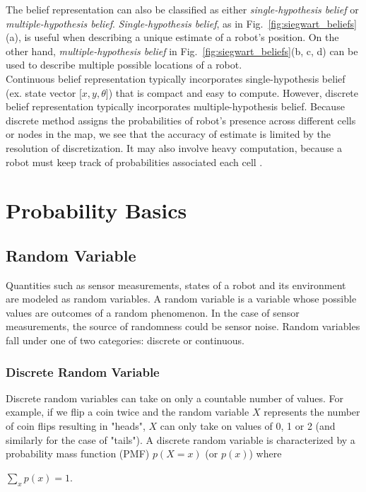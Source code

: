 \documentclass[twoside]{article}
\begin{document}
The belief representation can also be classified as either \emph{single-hypothesis belief} or \emph{multiple-hypothesis belief}. \emph{Single-hypothesis belief}, as in Fig.~\ref{fig:siegwart_beliefs}(a), is useful when describing a unique estimate of a robot's position. On the other hand, \emph{multiple-hypothesis belief} in Fig.~\ref{fig:siegwart_beliefs}(b, c, d) can be used to describe multiple possible locations of a robot. \\

Continuous belief representation typically incorporates single-hypothesis belief (ex. state vector [$x, y, \theta$]) that is compact and easy to compute. However, discrete belief representation typically incorporates multiple-hypothesis belief. Because discrete method assigns the probabilities of robot's presence across different cells or nodes in the map, we see that the accuracy of estimate is limited by the resolution of discretization. It may also involve heavy computation, because a robot must keep track of probabilities associated each cell \cite{Clark}.

\section{Probability Basics}

\subsection{Random Variable}

Quantities such as sensor measurements, states of a robot and its environment are modeled as random variables. A random variable is a variable whose possible values are outcomes of a random phenomenon. In the case of sensor measurements, the source of randomness could be sensor noise. Random variables fall under one of two categories: discrete or continuous.

\subsubsection{Discrete Random Variable}

Discrete random variables can take on only a countable number of values. For example, if we flip a coin twice and the random variable $X$ represents the number of coin flips resulting in "heads", $X$ can only take on values of 0, 1 or 2 (and similarly for the case of "tails"). A discrete random variable is characterized by a probability mass function (PMF) $p(X=x)$ (or $p(x)$) where
\begin{center}
$\sum\limits_{x} p(x)=1$.
\end{center}
\end{document}

